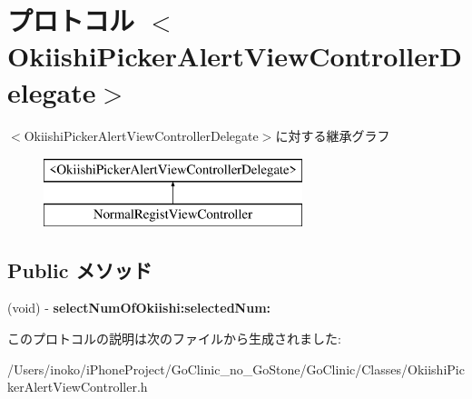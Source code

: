 \hypertarget{protocol_okiishi_picker_alert_view_controller_delegate-p}{
\section{プロトコル $<$OkiishiPickerAlertViewControllerDelegate$>$}
\label{protocol_okiishi_picker_alert_view_controller_delegate-p}
}
$<$OkiishiPickerAlertViewControllerDelegate$>$に対する継承グラフ\begin{figure}[H]
\begin{center}
\leavevmode
\includegraphics[height=2.000000cm]{protocol_okiishi_picker_alert_view_controller_delegate-p}
\end{center}
\end{figure}
\subsection*{Public メソッド}
\begin{DoxyCompactItemize}
\item 
\hypertarget{protocol_okiishi_picker_alert_view_controller_delegate-p_a17b033565e5f362d969709e978166fb1}{
(void) -\/ {\bfseries selectNumOfOkiishi:selectedNum:}}
\label{protocol_okiishi_picker_alert_view_controller_delegate-p_a17b033565e5f362d969709e978166fb1}

\end{DoxyCompactItemize}


このプロトコルの説明は次のファイルから生成されました:\begin{DoxyCompactItemize}
\item 
/Users/inoko/iPhoneProject/GoClinic\_\-no\_\-GoStone/GoClinic/Classes/OkiishiPickerAlertViewController.h\end{DoxyCompactItemize}

